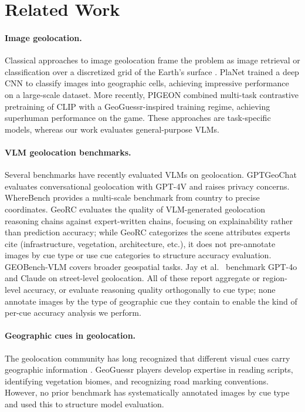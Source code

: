 \documentclass[twoside,11pt]{article}
\begin{document}
\section{Related Work}
\label{sec:related}

\paragraph{Image geolocation.} Classical approaches to image geolocation frame the problem as image retrieval \citep{hays2008im2gps} or classification over a discretized grid of the Earth's surface \citep{muller2018geolocation}. PlaNet \citep{weyand2016planet} trained a deep CNN to classify images into geographic cells, achieving impressive performance on a large-scale dataset. More recently, PIGEON \citep{haas2024pigeon} combined multi-task contrastive pretraining of CLIP with a GeoGuessr-inspired training regime, achieving superhuman performance on the game. These approaches are task-specific models, whereas our work evaluates general-purpose VLMs.

\paragraph{VLM geolocation benchmarks.} Several benchmarks have recently evaluated VLMs on geolocation. GPTGeoChat \citep{mendes2024gptgeochat} evaluates conversational geolocation with GPT-4V and raises privacy concerns. WhereBench \citep{wherebench2025} provides a multi-scale benchmark from country to precise coordinates. GeoRC \citep{talreja2026georc} evaluates the quality of VLM-generated geolocation reasoning chains against expert-written chains, focusing on explainability rather than prediction accuracy; while GeoRC categorizes the scene attributes experts cite (infrastructure, vegetation, architecture, etc.), it does not pre-annotate images by cue type or use cue categories to structure accuracy evaluation. GEOBench-VLM \citep{danish2025geobench} covers broader geospatial tasks. Jay et al.\ \citep{jay2025precise} benchmark GPT-4o and Claude on street-level geolocation. All of these report aggregate or region-level accuracy, or evaluate reasoning quality orthogonally to cue type; none annotate images by the type of geographic cue they contain to enable the kind of per-cue accuracy analysis we perform.

\paragraph{Geographic cues in geolocation.} The geolocation community has long recognized that different visual cues carry geographic information \citep{hays2008im2gps}. GeoGuessr players develop expertise in reading scripts, identifying vegetation biomes, and recognizing road marking conventions. However, no prior benchmark has systematically annotated images by cue type and used this to structure model evaluation.
\end{document}
